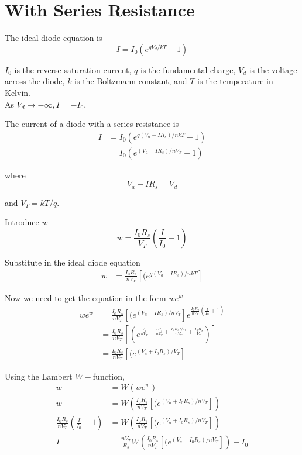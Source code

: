 \documentclass[12pt]{article}
\date{\today }
\author{
Paul W. Leu\\
University of Pittsburgh\\
Pittsburgh, PA}
\numberwithin{equation}{section}
\begin{document}
\section{With Series Resistance}

The ideal diode equation is
\begin{equation}
I = I_0 ( e^{qV_d/kT} - 1)
\end{equation}

$I_0$ is the reverse saturation current, $q$ is the fundamental charge, $V_d$ is the voltage across the diode, $k$ is the Boltzmann constant, and $T$ is the temperature in Kelvin.
\\ As $V_d \rightarrow -\infty, I = -I_0$,

The current of a diode with a series resistance is
\begin{align}
I &=  I_0 (e^{q (V_a - I R_s)/nkT} - 1) \\
&=  I_0 (e^{ (V_a - I R_s)/n V_T} - 1)
\end{align}

where
\begin{equation}
V_a - I R_s = V_d
\end{equation}

and $V_T = k T/q$.

Introduce $w$
\begin{equation}
w = \frac{I_0 R_s}{V_T} \left ( \frac{I}{I_0} + 1 \right )
\end{equation}

Substitute in the ideal diode equation
\begin{align}
w &= \frac{I_0 R_s}{n V_T} \left [  (e^{q (V_a - I R_s)/nkT} \right ]
\end{align}

Now we need to get the equation in the form $w e^w$
\begin{align}
w e^{w} &= \frac{I_0 R_s}{n V_T} \left [  (e^{(V_a - I R_s)/n V_T} \right ] e^{\frac{I_0 R_s}{n V_T} \left ( \frac{I}{I_0} + 1 \right )} \\
&= \frac{I_0 R_s}{n V_T} \left [  (e^{\frac{V_a}{n V_T}-\frac{I R_s}{n V_T}+\frac{I_0 R_s I/I_0}{ n V_T}+\frac{I_0 R_s}{V_T}}) \right]
\\
&= \frac{I_0 R_s}{n V_T} \left [  (e^{(V_a + I_0 R_s)/V_T} \right ]
\end{align}

Using the Lambert $W-$function,
\begin{align}
w&= W \left ( w e^{w} \right ) \\
w &= W \left ( \frac{I_0 R_s}{n V_T} \left [  (e^{(V_a + I_0 R_s)/n V_T} \right ] \right ) \\
\frac{I_0 R_s}{n V_T} \left ( \frac{I}{I_0} + 1 \right )  &= W \left ( \frac{I_0 R_s}{n V_T} \left [  (e^{(V_a + I_0 R_s)/ n V_T} \right ] \right ) \\
I &= \frac{n V_T}{R_s} W \left ( \frac{I_0 R_s}{n V_T} \left [  (e^{(V_a + I_0 R_s)/n V_T} \right ] \right )  - I_0
\end{align}
\end{document}
